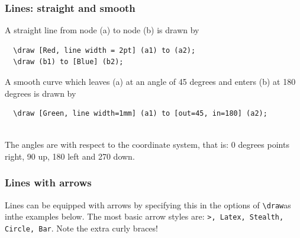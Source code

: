 \documentclass[10pt,letterpaper,twoside,notitlepage]{article}
\numberwithin{figure}{section}
\begin{document}
\subsubsection{Lines: straight and smooth}
%
\noindent
A straight line from node (a) to node (b) is drawn by\\

\noindent
\begin{minipage}{0.83\linewidth}
\brocol\begin{verbatim}
  \draw [Red, line width = 2pt] (a1) to (a2);
  \draw (b1) to [Blue] (b2);
\end{verbatim}\txcol
\end{minipage}
%
\begin{minipage}{0.16\linewidth}
\end{minipage}
%
A smooth curve which leaves (a) at an angle of 45 degrees 
and enters (b) at 180 degrees is drawn by\\

\noindent
\begin{minipage}{0.83\linewidth}
\brocol\begin{verbatim}
  \draw [Green, line width=1mm] (a1) to [out=45, in=180] (a2);
\end{verbatim}\txcol
\end{minipage}
%
\begin{minipage}{0.16\linewidth}
\end{minipage}
\\
\noindent
The angles are with respect to the coordinate system, that is: 
0 degrees points right, 90 up, 180 left and 270 down.
%
%
\subsubsection{Lines with arrows}
%
Lines can be equipped with arrows by specifying this
in the options of \brocol\verb$\draw$\txcol as inthe examples below.
The most basic arrow styles are:
\brocol\verb$>, Latex, Stealth, Circle, Bar$\txcol.
Note the extra curly braces!\\
\end{document}
